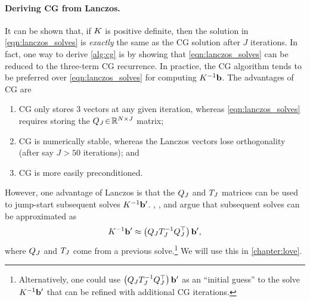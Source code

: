 \paragraph{Deriving CG from Lanczos.}
It can be shown that, if $K$ is positive definite, then the solution in \cref{eqn:lanczos_solves} is \emph{exactly} the same as the CG solution after $J$ iterations.
In fact, one way to derive \cref{alg:cg} is by showing that \cref{eqn:lanczos_solves} can be reduced to the three-term CG recurrence.
In practice, the CG algorithm tends to be preferred over \cref{eqn:lanczos_solves} for computing $K^{-1} \mathbf{b}$.
The advantages of CG are
\begin{enumerate}
  \item CG only stores 3 vectors at any given iteration, whereas \cref{eqn:lanczos_solves} requires storing the $Q_J \! \in \! \mathbb{R}^{N \times J}$ matrix;
  \item CG is numerically stable, whereas the Lanczos vectors lose orthogonality (after say $J > 50$ iterations); and
  \item CG is more easily preconditioned.
\end{enumerate}
However, one advantage of Lanczos is that the $Q_J$ and $T_J$ matrices can be used to jump-start subsequent solves $K^{-1} \mathbf{b}'$.
\citet{parlett1980new}, \citet{saad1987lanczos}, and \citet{schneider2001krylov} argue that subsequent solves can be approximated as
%
\begin{equation}
  K^{-1} \mathbf{b}' \approx \left( Q_J T_J^{-1} Q_J^\top \right) \mathbf{b}',
  \label{eqn:lanczos_solve}
\end{equation}
%
where $Q_J$ and $T_J$ come from a previous solve.\footnote{
  Alternatively, one could use $\left( Q_J T_J^{-1} Q_J^\top \right) \mathbf{b}'$ as an ``initial guess'' to the solve $K^{-1} \mathbf{b}'$ that can be refined with additional CG iterations.
}
We will use this in \cref{chapter:love}.

